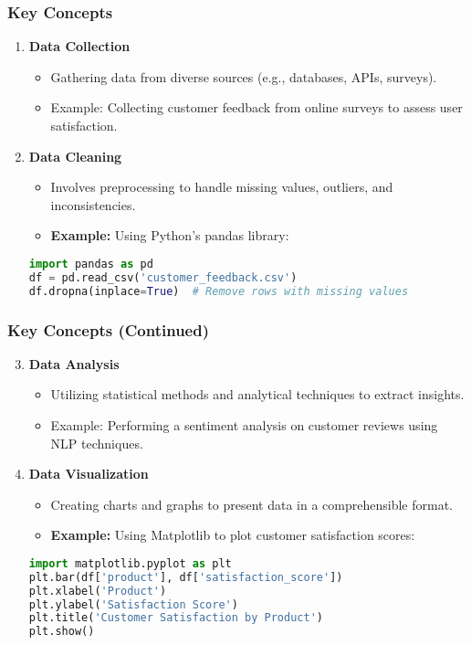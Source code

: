 \documentclass[aspectratio=169]{beamer}
\begin{document}
\begin{frame}
    \frametitle{Key Concepts}
    \begin{enumerate}
        \item \textbf{Data Collection}
            \begin{itemize}
                \item Gathering data from diverse sources (e.g., databases, APIs, surveys).
                \item Example: Collecting customer feedback from online surveys to assess user satisfaction.
            \end{itemize}

        \item \textbf{Data Cleaning}
            \begin{itemize}
                \item Involves preprocessing to handle missing values, outliers, and inconsistencies.
                \item \textbf{Example:} Using Python’s pandas library:
                \end{itemize}
                \begin{lstlisting}[language=Python]
import pandas as pd
df = pd.read_csv('customer_feedback.csv')
df.dropna(inplace=True)  # Remove rows with missing values
                \end{lstlisting}
                
    \end{enumerate}
\end{frame}

\begin{frame}
    \frametitle{Key Concepts (Continued)}
    \begin{enumerate}
        \setcounter{enumi}{2}
        \item \textbf{Data Analysis}
            \begin{itemize}
                \item Utilizing statistical methods and analytical techniques to extract insights.
                \item Example: Performing a sentiment analysis on customer reviews using NLP techniques.
            \end{itemize}
        
        \item \textbf{Data Visualization}
            \begin{itemize}
                \item Creating charts and graphs to present data in a comprehensible format.
                \item \textbf{Example:} Using Matplotlib to plot customer satisfaction scores:
            \end{itemize}
            \begin{lstlisting}[language=Python]
import matplotlib.pyplot as plt
plt.bar(df['product'], df['satisfaction_score'])
plt.xlabel('Product')
plt.ylabel('Satisfaction Score')
plt.title('Customer Satisfaction by Product')
plt.show()
            \end{lstlisting}
    \end{enumerate}
\end{frame}
\end{document}
